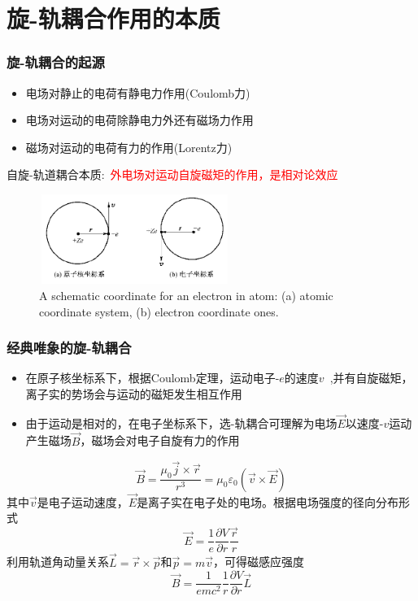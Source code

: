 \documentclass[cjk,slidestop,compress,mathserif,blue]{beamer}
\begin{document}
\section{旋-轨耦合作用的本质}
\frame
{
\frametitle{旋-轨耦合的起源}
\begin{itemize}
	\item 电场对静止的电荷有静电力作用(\textrm{Coulomb}力)
	\item 电场对运动的电荷除静电力外还有磁场力作用
	\item 磁场对运动的电荷有力的作用(\textrm{Lorentz}力)
\end{itemize}
自旋-轨道耦合本质:~\textcolor{red}{外电场对运动自旋磁矩的作用，是相对论效应}
\begin{figure}[h!]
\centering
\includegraphics[height=1.15in,width=2.45in,viewport=0 0 600 270,clip]{Figures/SOC_cor.png}
\caption{\tiny \textrm{A schematic coordinate for an electron in atom: (a) atomic coordinate system, (b) electron coordinate ones.}}%
\label{Muffin_tin}
\end{figure}
}

\frame
{
	\frametitle{经典唯象的旋-轨耦合}
	\begin{itemize}
		\item 在原子核坐标系下，根据\textrm{Coulomb}定理，运动电子-$e$的速度$v$~,并有自旋磁矩，离子实的势场会与运动的磁矩发生相互作用
		\item 由于运动是相对的，在电子坐标系下，选-轨耦合可理解为电场$\vec E$以速度-$v$运动产生磁场$\vec B$，磁场会对电子自旋有力的作用
	\end{itemize}
	\begin{displaymath}
		\vec B=\frac{\mu_0\vec j\times\vec r}{r^3}=\mu_0\varepsilon_0(\vec v\times\vec E)
	\end{displaymath}
其中$\vec v$是电子运动速度，$\vec E$是离子实在电子处的电场。根据电场强度的径向分布形式
\begin{displaymath}
	\vec E=\frac1{e}\frac{\partial V}{\partial r}\frac{\vec r}r
\end{displaymath}
利用轨道角动量关系$\vec L=\vec r\times\vec p$和$\vec p=m\vec v$，可得磁感应强度
\begin{displaymath}
	\vec B=\frac1{emc^2}\frac1r\frac{\partial V}{\partial r}\vec L
\end{displaymath}
}
\end{document}
